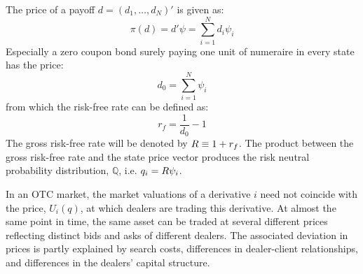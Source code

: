 \documentclass[main.tex]{subfiles}
\begin{document}
        The price of a payoff $d=\left(d_{1}, \dots, d_{N}\right)'$ is given as:
            \begin{equation}
                \pi(d) = d'\psi = \sum_{i=1}^{N} d_{i}\psi_{i}
            \end{equation}
        Especially a zero coupon bond surely paying one unit of numeraire in every state has the price:
            \begin{equation}
                d_{0} = \sum_{i=1}^{N} \psi_{i}
            \end{equation}
        from which the risk-free rate can be defined as:
            \begin{equation}
                r_{f} = \frac{1}{d_{0}} - 1
            \end{equation}
        The gross risk-free rate will be denoted by $R \equiv 1 + r_{f}$.
        The product between the gross risk-free rate and the state price vector produces the risk neutral probability distribution, $\mathbb{Q}$, i.e. $q_{i} = R\psi_{i}$.

        In an OTC market, the market valuations of a derivative $i$ need not coincide with the price, $U_{i}(q)$, at which dealers are trading this derivative.
        At almost the same point in time, the same asset can be traded at several different prices reflecting distinct bids and asks of different dealers.
        The associated deviation in prices is partly explained by search costs, differences in dealer-client relationships, and differences in the dealers' capital structure.
\end{document}
